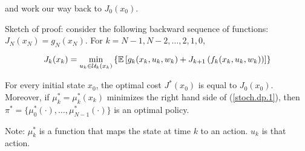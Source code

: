 and work our way back to \(J_0(x_0)\). 

Sketch of proof: consider the following backward sequence of functions: \(J_N(x_N) = g_N(x_N)\). For \(k = N-1, N-2, \ldots, 2, 1, 0\), 

\begin{equation}\label{stoch.dp.1}
J_{k}(x_{k}) =  \underset{u_{k} \in \mathcal{U}_k(x_k)}{\min} \left\{  \mathbb{E}\left[ g_k(x_k, u_k, w_k) + J_{k+1} \left (f_k(x_k, u_k, w_k) \right)\right] \right\}
\end{equation}

\begin{theorem}

For every initial state \(x_0\), the optimal cost \(J^*(x_0)\) is equal to \(J_0(x_0)\). Moreover, if \(\mu_k^* = \mu_k^*(x_k)\) minimizes the right hand side of (\ref{stoch.dp.1}), then \(\pi^* =  \{\mu_0^*(\cdot), \ldots, \mu_{N-1}^*(\cdot)\}\) is an optimal policy.

\end{theorem}

Note: \(\mu_k^*\) is a function that maps the state at time \(k\) to an action. \(u_k\) is that action.

